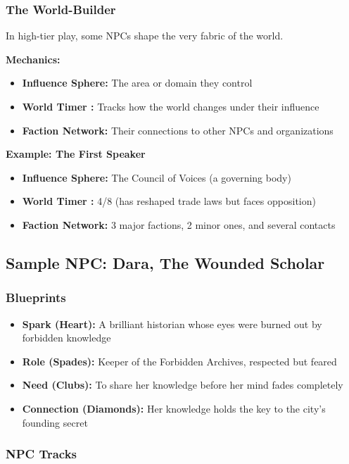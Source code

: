 \documentclass[10pt]{article}
\begin{document}
\subsubsection{The World-Builder}

In high-tier play, some NPCs shape the very fabric of the world.

\textbf{Mechanics:}
\begin{itemize}
  \item \textbf{Influence Sphere:} The area or domain they control
  \item \textbf{World Timer :} Tracks how the world changes under their influence
  \item \textbf{Faction Network:} Their connections to other NPCs and organizations
\end{itemize}

\textbf{Example: The First Speaker}
\begin{itemize}
  \item \textbf{Influence Sphere:} The Council of Voices (a governing body)
  \item \textbf{World Timer :} 4/8 (has reshaped trade laws but faces opposition)
  \item \textbf{Faction Network:} 3 major factions, 2 minor ones, and several contacts
\end{itemize}

\subsection{Sample NPC: Dara, The Wounded Scholar}

\subsubsection{Blueprints}

\begin{itemize}
  \item \textbf{Spark (Heart):} A brilliant historian whose eyes were burned out by forbidden knowledge
  \item \textbf{Role (Spades):} Keeper of the Forbidden Archives, respected but feared
  \item \textbf{Need (Clubs):} To share her knowledge before her mind fades completely
  \item \textbf{Connection (Diamonds):} Her knowledge holds the key to the city's founding secret
\end{itemize}

\subsubsection{NPC Tracks}
\end{document}
